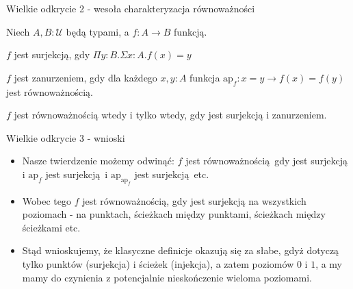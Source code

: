 \documentclass{beamer}
\newcommand{\U}{\mathcal{U}}
\begin{document}
\begin{frame}{Wielkie odkrycie 2 - wesoła charakteryzacja równoważności}

Niech $A, B : \U$ będą typami, a $f: A \to B$ funkcją.

\begin{definition}
$f$ jest surjekcją, gdy $\Pi y : B. \Sigma x : A. f(x) = y$
\end{definition}

\begin{definition}[Zanurzenie]
$f$ jest zanurzeniem, gdy dla każdego $x, y : A$ funkcja $\text{ap}_f : x = y \to f(x) = f(y)$ jest równoważnością.
\end{definition}

\begin{theorem}
$f$ jest równoważnością wtedy i tylko wtedy, gdy jest surjekcją i zanurzeniem.
\end{theorem}

\end{frame}

\begin{frame}{Wielkie odkrycie 3 - wnioski}
\begin{itemize}
	\item Nasze twierdzenie możemy odwinąć: $f$ jest równoważnością gdy jest surjekcją i $\text{ap}_f$ jest surjekcją i $\text{ap}_{\text{ap}_f}$ jest surjekcją etc.
	\item Wobec tego $f$ jest równoważnością, gdy jest surjekcją na wszystkich poziomach - na punktach, ścieżkach między punktami, ścieżkach między ścieżkami etc.
	\item Stąd wnioskujemy, że klasyczne definicje okazują się za słabe, gdyż dotyczą tylko punktów (surjekcja) i ścieżek (injekcja), a zatem poziomów $0$ i $1$, a my mamy do czynienia z potencjalnie nieskończenie wieloma poziomami.
\end{itemize}
\end{frame}
\end{document}

